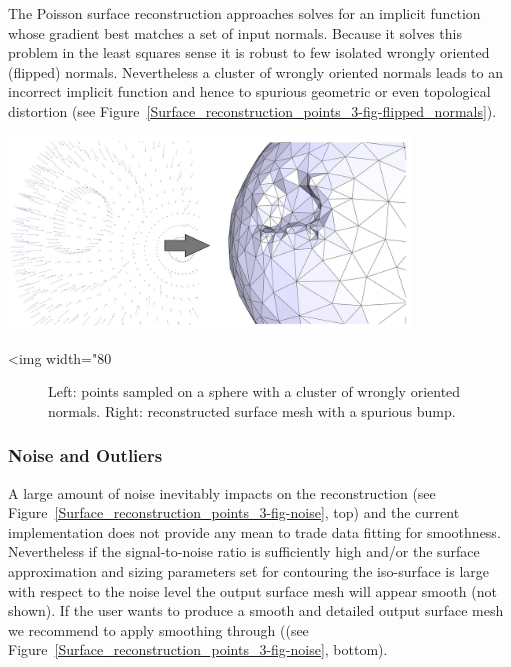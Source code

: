 The Poisson surface reconstruction approaches solves for an implicit function whose gradient best matches a set of input normals. Because it solves this problem in the least squares sense it is robust to few isolated wrongly oriented (flipped) normals. Nevertheless a cluster of wrongly oriented normals leads to an incorrect implicit function and hence to spurious geometric or even topological distortion (see Figure~\ref{Surface_reconstruction_points_3-fig-flipped_normals}).

\begin{center}
    \label{Surface_reconstruction_points_3-fig-flipped_normals}
    \begin{ccTexOnly}
\includegraphics[width=0.8\textwidth]{Surface_reconstruction_points_3/flipped_normals}
    \end{ccTexOnly}
    \begin{ccHtmlOnly}
        <img width="80%
    \end{ccHtmlOnly}
    \begin{figure}[h]
        \caption{Left: points sampled on a sphere with a cluster
                 of wrongly oriented normals.
                 Right: reconstructed surface mesh with a spurious bump.}
    \end{figure}
\end{center}


\subsubsection{Noise and Outliers}

A large amount of noise inevitably impacts on the reconstruction (see Figure~\ref{Surface_reconstruction_points_3-fig-noise}, top) and the current implementation does not provide any mean to trade data fitting for smoothness. Nevertheless if the signal-to-noise ratio is sufficiently high and/or the 
surface approximation and sizing parameters set for contouring the iso-surface is large with respect to the noise level the output surface mesh will appear smooth (not shown). If the user wants to produce a smooth and detailed output surface mesh we recommend to apply smoothing through  ((see Figure~\ref{Surface_reconstruction_points_3-fig-noise}, bottom).

